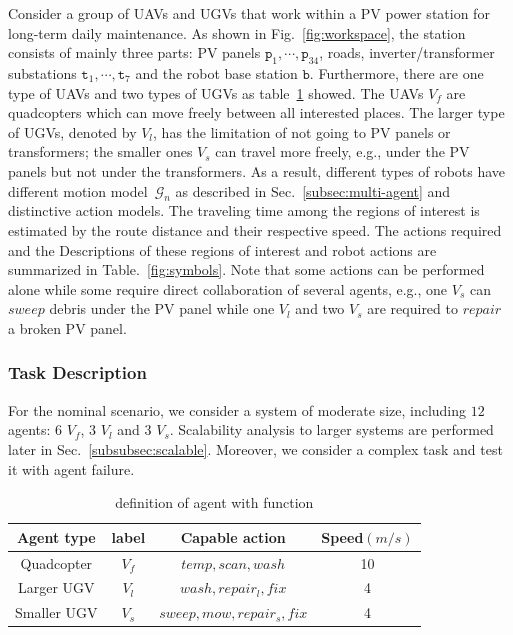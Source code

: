 Consider a group of UAVs and UGVs that work within a PV power station for
long-term daily maintenance.
As shown in Fig.~\ref{fig:workspace},
the station consists of mainly three parts: PV panels $\texttt{p}_1,\cdots,\texttt{p}_{34}$, roads,
inverter/transformer substations $\texttt{t}_1,\cdots,\texttt{t}_7$ and the robot base station $\texttt{b}$. 
Furthermore, there are one type of UAVs and two types of UGVs as table~\ref{table:agent} showed.
The UAVs $V_f$ are quadcopters which can move freely between all interested places.
The larger type of UGVs, denoted by $V_l$, has the limitation of not going to PV panels or transformers;
the smaller ones $V_s$ can travel more freely, e.g., under the PV panels but not under the transformers. 
As a result, different types of robots have different motion 
model~$\mathcal{G}_n$ as described in Sec.~\ref{subsec:multi-agent}
and distinctive action models.
The traveling time among the regions of interest is estimated by the route
distance and their respective speed. The actions required and the  
Descriptions of these regions of interest and robot actions are summarized in
Table.~\ref{fig:symbols}.
Note that some actions can be performed alone while some require direct
collaboration of several agents,
e.g., one $V_s$ can $sweep$ debris under the PV panel while one $V_l$
and two $V_s$ are required to $repair$ a broken PV panel.


\subsubsection{Task Description}\label{subsubsec:task}

For the nominal scenario, we consider a system of moderate size,
including $12$ agents: 6 $V_f$, 3 $V_l$ and 3 $V_s$.
Scalability analysis to larger systems are performed later in Sec.~\ref{subsubsec:scalable}.
Moreover, we consider a complex task and test it with agent failure.

\begin{table}[t]
\caption{definition of agent with function}
\label{table:agent}
\begin{tabular}{|c|c |c|c|}\hline
	\textbf{Agent type} &\textbf{label} & \textbf{Capable action} & \textbf{Speed}$(m/ s )$\\ \hline
	 Quadcopter& $V_f$  & $temp, scan, wash $ & 10 \\ \hline
	 Larger UGV& $V_l$  & $wash,repair_l,fix$ & 4 \\ \hline
	 Smaller UGV& $V_s$  &  $sweep, mow, repair_s, fix$ & 4 \\ \hline
\end{tabular}
\end{table}


